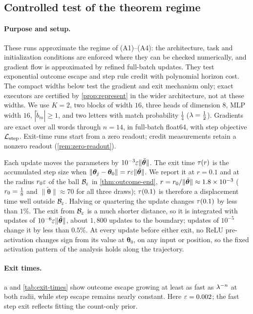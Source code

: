 \subsection{Controlled test of the theorem regime}
\label{app:exp-regime}
\label{app:regime}
\paragraph{Purpose and setup.} These runs approximate the regime of (A1)--(A4): the architecture, task and initialization conditions are enforced where
they can be checked numerically, and gradient flow is approximated by refined full-batch updates. They test exponential outcome
escape and step rule credit with polynomial horizon cost. The compact widths below test the gradient and exit mechanism only;
exact executors are certified by \cref{prop:represent} in the wider architecture, not at these widths.
We use $K=2$, two blocks of width $16$, three heads of dimension $8$, MLP width $16$, $|\tilde b_m|\ge1$,
and two letters with match probability $\tfrac{1}{4}$ ($\mixrate=\tfrac{1}{2}$). Gradients are exact over all words through $n=14$,
in full-batch float64, with step objective $\mathcal L_{\mathrm{step}}$. Exit-time runs start from a zero readout; credit measurements retain a
nonzero readout (\cref{rem:zero-readout}).

Each update moves the parameters by $10^{-3}\varepsilon\|\tilde{\bm\theta}\|$.
The exit time $\tau(r)$ is the accumulated step size when $\|\bm\theta_j-\bm\theta_0\|=r\varepsilon\|\tilde{\bm\theta}\|$. We report it at
$r=0.1$ and at the radius $r_0\varepsilon$ of the ball $\mathcal B_{\varepsilon}$ in \cref{thm:outcome-end}, $r=r_0/\|\tilde{\bm\theta}\|\approx1.8\times10^{-3}$
($\ballradius=\tfrac{1}{8}$ and $\|\tilde{\bm\theta}\|\approx70$ for all three draws); $\tau(0.1)$ is therefore a displacement time well outside $\mathcal B_{\varepsilon}$.
Halving or quartering the update changes $\tau(0.1)$ by less than $1\%$. The exit from $\mathcal B_{\varepsilon}$ is a much shorter distance, so
it is integrated with updates of $10^{-6}\varepsilon\|\tilde{\bm\theta}\|$, about $1{,}800$ updates to the boundary; updates of $10^{-5}$ change it by
less than $0.5\%$. At every update before either exit, no ReLU pre-activation
changes sign from its value at $\bm\theta_0$, on any input or position, so the fixed activation pattern of the analysis holds along the trajectory.

\paragraph{Exit times.} a and \cref{tab:exit-times} show outcome escape growing at least as fast as
$\lambda^{-n}$ at both radii, while step escape remains nearly constant. Here $\varepsilon=0.002$; the fast step exit reflects fitting the
count-only prior.

